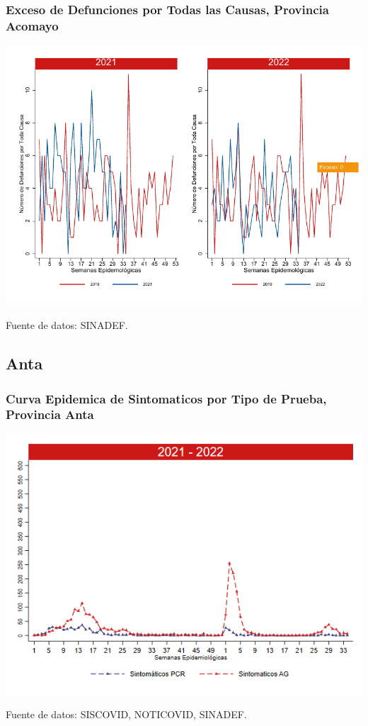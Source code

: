 \documentclass[xcolor=table]{beamer}
\begin{document}
\begin{frame}
	\frametitle{Exceso de Defunciones por Todas las Causas, Provincia Acomayo}
	\vspace{-.5cm}
	\begin{center}	
		\includegraphics[width=0.8\linewidth, trim={0cm .5cm 0cm 0.2cm},clip]{../figuras/exceso_1.pdf}
	\end{center}
	{\tiny Fuente de datos: SINADEF.}
	
	\hyperlink{indicadores_provinciales}{}
\end{frame}

\subsection{Anta}
\begin{frame}[label=Anta]
	\frametitle{Curva Epidemica de Sintomaticos por Tipo de Prueba, Provincia Anta}
	\vspace{-.5cm}
	\begin{center}
		\includegraphics[width=0.8\linewidth, trim={0cm .5cm 0cm 0.2cm},clip]{../figuras/sinto_prueba20_21_2.png}
	\end{center}
	{\tiny Fuente de datos: SISCOVID, NOTICOVID, SINADEF.}
	\hyperlink{TipoPrueba}{}
\end{frame}
\end{document}
